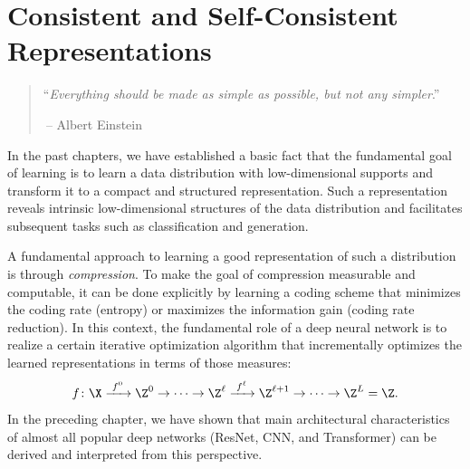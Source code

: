\documentclass[../../book-main.tex]{subfiles}
\begin{document}
\chapter{Consistent and Self-Consistent Representations}
\label{ch:consistent}\label{ch:autoencoding}
\label{ch:self-consistent}\label{ch:closed-loop}

\begin{quote}
\hfill  ``{\em Everything should be made as simple as possible, but not any simpler}.''

$~$\hfill -- Albert Einstein
\end{quote}



\vspace{5mm}


In the past chapters, we have established a basic fact that the
fundamental goal of learning is to learn a data
distribution with low-dimensional supports and transform it to a compact and structured
representation. Such a representation reveals intrinsic
low-dimensional structures of the data distribution and facilitates
subsequent tasks such as classification and generation.

A fundamental approach to learning a good representation of such a
distribution is through {\em compression}. To make the
goal of compression measurable and computable, it can be done
explicitly by learning a coding scheme that minimizes the coding rate (entropy) or maximizes the information gain (coding rate
reduction). In this context, the fundamental role of a deep neural
network is to realize a certain iterative optimization algorithm that
incrementally optimizes the learned representations in terms of those measures:
\begin{equation}
  f\colon \X
  \xrightarrow{\hspace{1mm} f^0 \hspace{1mm}} \Z^0 \rightarrow \cdots
  \rightarrow \Z^\ell \xrightarrow{\hspace{1mm} f^\ell \hspace{1mm}}
  \Z^{\ell+1} \rightarrow  \cdots \to \Z^L = \Z.
\end{equation}
In the preceding chapter, we have shown that main architectural
characteristics of almost all popular deep networks (ResNet, CNN, and
Transformer) can be derived and interpreted from this perspective.
\end{document}
